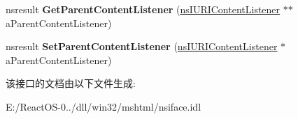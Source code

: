 \begin{DoxyCompactItemize}
\item 
\mbox{\label{interfacens_i_u_r_i_content_listener_ad4a7057cf337a56ea53eabf65b231c5e}} 
nsresult {\bfseries Get\+Parent\+Content\+Listener} (\hyperlink{interfacens_i_u_r_i_content_listener}{ns\+I\+U\+R\+I\+Content\+Listener} $\ast$$\ast$a\+Parent\+Content\+Listener)
\item 
\mbox{\label{interfacens_i_u_r_i_content_listener_a3d6480663e1623efe5ceadf62c5ed1b4}} 
nsresult {\bfseries Set\+Parent\+Content\+Listener} (\hyperlink{interfacens_i_u_r_i_content_listener}{ns\+I\+U\+R\+I\+Content\+Listener} $\ast$a\+Parent\+Content\+Listener)
\end{DoxyCompactItemize}


该接口的文档由以下文件生成\+:\begin{DoxyCompactItemize}
\item 
E\+:/\+React\+O\+S-\/0../dll/win32/mshtml/nsiface.\+idl\end{DoxyCompactItemize}
